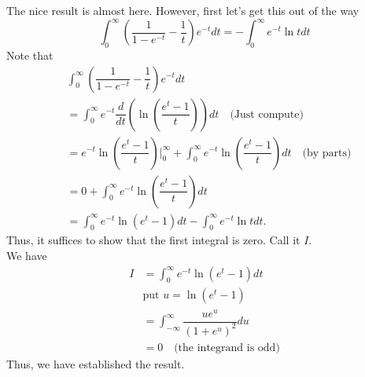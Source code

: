 \begin{mdframed}[style=boxstyle, frametitle={Another pesky integral}]
	The nice result is almost here. However, first let's get this out of the way
	\begin{equation} \label{eq:pesky}
		\int_{0}^{\infty} \left(\dfrac{1}{1 - e^{-t}} - \dfrac{1}{t}\right)e^{-t} dt = -\int_{0}^{\infty} e^{-t}\ln t dt
	\end{equation}
	Note that
	\begin{align*} 
		&\int_{0}^{\infty} \left(\dfrac{1}{1 - e^{-t}} - \dfrac{1}{t}\right)e^{-t} dt \\
		&= \int_{0}^{\infty} e^{-t}\dfrac{d}{dt}\left(\ln\left(\dfrac{e^t - 1}{t}\right)\right) dt \quad \text{(Just compute)}\\
		&= e^{-t}\ln\left(\dfrac{e^t - 1}{t}\right)\Bigg|_0^\infty + \int_{0}^{\infty} e^{-t}\ln\left(\dfrac{e^t - 1}{t}\right) dt \quad \text{(by parts)}\\
		&= 0 + \int_{0}^{\infty} e^{-t}\ln\left(\dfrac{e^t - 1}{t}\right) dt\\
		&= \int_{0}^{\infty} e^{-t}\ln(e^t - 1)dt - \int_{0}^{\infty} e^{-t}\ln t dt.
	\end{align*}
	Thus, it suffices to show that the first integral is zero. Call it $I.$ \\
	We have
	\begin{align*} 
		I &= \int_{0}^{\infty} e^{-t}\ln(e^t - 1)dt\\
		& \text{put } u =\ln(e^t - 1)\\
		&= \int_{-\infty}^{\infty} \dfrac{ue^u}{(1 + e^u)^2} du\\
		&= 0 \quad \text{(the integrand is odd)}
	\end{align*}
	Thus, we have established the result.
\end{mdframed}

\newpage


